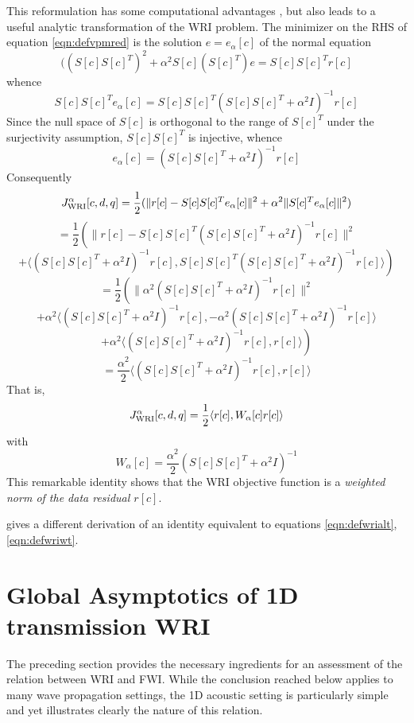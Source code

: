 This reformulation has some computational advantages \cite[]{WangYingst:SEG16,Herrmann:SEG19}, but also leads to a useful analytic transformation of the WRI problem. The minimizer on the RHS of equation \ref{eqn:defvpmred} is the solution $e=e_{\alpha}[c]$ of the normal equation
\[
 ( (S[c]S[c]^T)^2 + \alpha^2S[c](S[c]^T)e = S[c]S[c]^Tr[c]
\]
whence
\[
  S[c]S[c]^Te_{\alpha}[c] = S[c]S[c]^T(S[c]S[c]^T+\alpha^2I)^{-1}r[c]
\]
Since the null space of $S[c]$ is orthogonal to the range of $S[c]^T$
under the surjectivity assumption, $S[c]S[c]^T$ is injective, whence
\begin{equation}
  \label{eqn:norsol}
  e_{\alpha}[c]=(S[c]S[c]^T+\alpha^2I)^{-1}r[c]
\end{equation}
Consequently
\[
  J_{\rm WRI}^{\alpha}[c,d,q] =
  \frac{1}{2}(\|r[c]-S[c]S[c]^Te_{\alpha}[c]\|^2+\alpha^2\|S[c]^Te_{\alpha}[c]\|^2)
\]
\[
  = \frac{1}{2}\left(\|r[c]-S[c]S[c]^T
    (S[c]S[c]^T+\alpha^2I)^{-1}r[c]\|^2 \right.
\]
\[
  \left.+\langle (S[c]S[c]^T+\alpha^2I)^{-1}r[c],
  S[c]S[c]^T (S[c]S[c]^T+\alpha^2I)^{-1}r[c]
  \rangle\right)
\]
\[
  =\frac{1}{2}\left(\|\alpha^2 (S[c]S[c]^T+\alpha^2I)^{-1}r[c]\|^2\right.
\]
\[
  \left.
  +\alpha^2\langle (S[c]S[c]^T+\alpha^2I)^{-1}r[c],
  -\alpha^2 (S[c]S[c]^T+\alpha^2I)^{-1}r[c]\rangle\right.
\]
\[
  + \left.\alpha^2\langle (S[c]S[c]^T+\alpha^2I)^{-1}r[c],r[c]\rangle\right)
\]
\[
  =  \frac{\alpha^2}{2}
\langle (S[c]S[c]^T+\alpha^2I)^{-1}r[c],r[c]\rangle 
\]
That is,
\begin{equation}
  \label{eqn:defwrialt}
  J_{\rm WRI}^{\alpha}[c,d,q] = \frac{1}{2}\langle r[c], W_{\alpha}[c] r[c]\rangle
\end{equation}
with
\begin{equation}
  \label{eqn:defwriwt}
  W_{\alpha}[c] = \frac{\alpha^2}{2}(S[c]S[c]^T+\alpha^2I)^{-1}
\end{equation}
This remarkable identity shows that the WRI objective function is a
{\em weighted norm of the data residual $r[c]$}.

\cite{Leeuwen2019note} gives a different derivation of an identity
equivalent to equations \ref{eqn:defwrialt}, \ref{eqn:defwriwt}.

\section{Global Asymptotics of 1D transmission WRI}
The preceding section provides the necessary ingredients for an assessment of the relation between WRI and FWI. While the conclusion reached below applies to many wave propagation settings, the 1D acoustic setting is particularly simple and yet illustrates clearly the nature of this relation.

